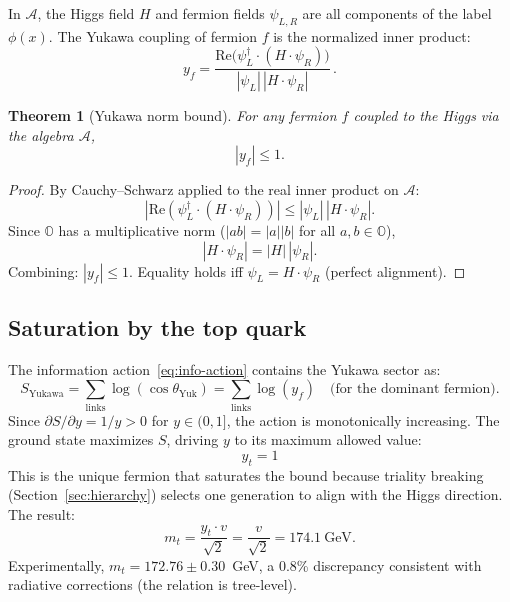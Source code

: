 \documentclass[12pt,a4paper]{article}
\newtheorem{theorem}{Theorem}
\theoremstyle{definition}
\theoremstyle{remark}
\newcommand{\Oct}{\mathbb{O}}
\newcommand{\Alg}{\mathcal{A}}
\begin{document}
In $\Alg$, the Higgs field $H$ and fermion fields $\psi_{L,R}$ are all 
components of the label $\phi(x)$. The Yukawa coupling of fermion $f$ 
is the normalized inner product:
\begin{equation}
y_f = \frac{\mathrm{Re}\bigl(\psi_L^\dagger \cdot (H \cdot \psi_R)\bigr)}
{|\psi_L|\,|H \cdot \psi_R|}\,.
\label{eq:yukawa-ip}
\end{equation}

\begin{theorem}[Yukawa norm bound]
\label{thm:norm-bound}
For any fermion $f$ coupled to the Higgs via the algebra $\Alg$,
\begin{equation}
|y_f| \leq 1.
\end{equation}
\end{theorem}

\begin{proof}
By Cauchy--Schwarz applied to the real inner product on $\Alg$:
\[
|\mathrm{Re}(\psi_L^\dagger \cdot (H\cdot\psi_R))| 
\leq |\psi_L|\,|H\cdot\psi_R|.
\]
Since $\Oct$ has a multiplicative norm ($|ab| = |a||b|$ for all $a,b\in\Oct$),
\[
|H\cdot\psi_R| = |H|\,|\psi_R|.
\]
Combining: $|y_f| \leq 1$. Equality holds iff $\psi_L = H\cdot\psi_R$ 
(perfect alignment).
\end{proof}

\subsection{Saturation by the top quark}

The information action~\eqref{eq:info-action} contains the Yukawa sector as:
\begin{equation}
S_{\text{Yukawa}} = \sum_{\text{links}} \log(\cos\theta_{\text{Yuk}}) 
= \sum_{\text{links}} \log(y_f) \quad \text{(for the dominant fermion)}.
\end{equation}
Since $\partial S/\partial y = 1/y > 0$ for $y\in(0,1]$, the action is 
monotonically increasing. The ground state maximizes $S$, driving $y$ to 
its maximum allowed value:
\begin{equation}
\boxed{y_t = 1}
\end{equation}
This is the unique fermion that saturates the bound because triality breaking 
(Section~\ref{sec:hierarchy}) selects one generation to align with the Higgs 
direction. The result:
\begin{equation}
m_t = \frac{y_t \cdot v}{\sqrt{2}} = \frac{v}{\sqrt{2}} = 174.1~\text{GeV}.
\end{equation}
Experimentally, $m_t = 172.76 \pm 0.30$~GeV, a 0.8\% discrepancy consistent 
with radiative corrections (the relation is tree-level).
\end{document}
